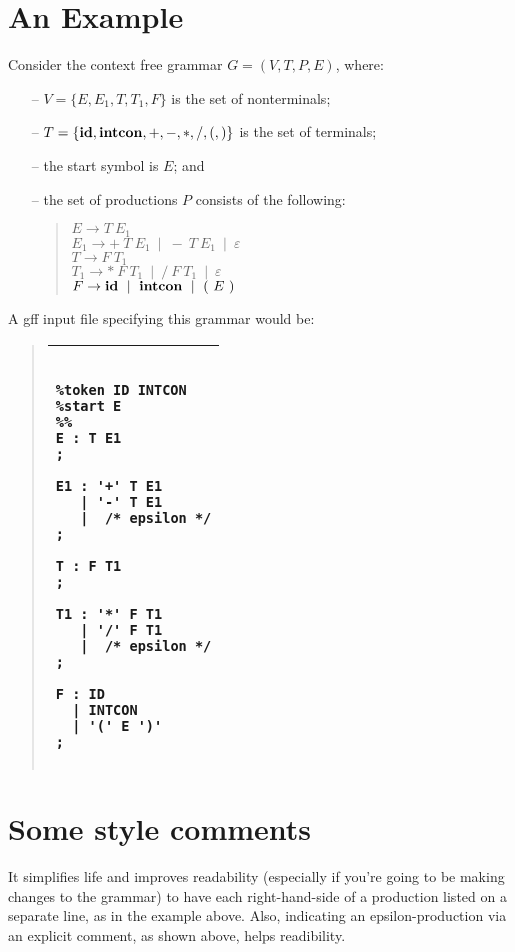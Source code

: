 \documentclass{article}
\newcommand{\gff}{{\sf gff }}
\begin{document}
\section{An Example}

Consider the context free grammar $G = (V, T, P, E)$, where:
%
\begin{itemize}
\item[--]
$V = \{E, E_1, T, T_1, F\}$ is the set of nonterminals;
\item[--]
$T = \{{\bf id}, {\bf intcon}, +, -, *, /, (, )\}$ is the set of terminals;
\item[--]
the start symbol is $E$; and
\item[--]
the set of productions $P$ consists of the following:
%
\begin{quote}
$E \rightarrow T ~ E_1$\\
$E_1 \rightarrow + ~T ~E_1 ~\mid~ - ~T ~E_1 ~\mid~ \varepsilon$\\
$T \rightarrow F ~ T_1$\\
$T_1 \rightarrow * ~F ~T_1 ~\mid~ / ~F ~T_1 ~\mid~ \varepsilon$\\
$F \rightarrow {\bf id} ~\mid~ {\bf intcon}  ~\mid~ ( ~E~ )$
\end{quote}
\end{itemize}
%
A \gff input file specifying this grammar would be:
%
\begin{quote}
\begin{tabular}{|l|}\hline
\begin{minipage}{3.5in}
\begin{verbatim}

%token ID INTCON
%start E
%%
E : T E1
;

E1 : '+' T E1
   | '-' T E1
   |  /* epsilon */
;

T : F T1
;

T1 : '*' F T1
   | '/' F T1
   |  /* epsilon */
;

F : ID
  | INTCON
  | '(' E ')'
;

\end{verbatim}
\end{minipage}
\\ \hline
\end{tabular}
\end{quote}
%
\section*{Some style comments}
It simplifies life and improves readability (especially
if you're going to be making changes to the grammar) to have each
right-hand-side of a production listed on a separate line, as in the example
above.  Also, indicating an epsilon-production via an explicit comment,
as shown above, helps readibility.
\end{document}
